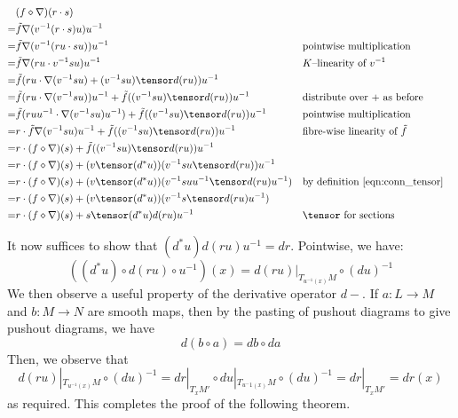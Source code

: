 \begin{align*}
   & (f \diamond \nabla)(r \cdot s) \\
  =& \tilde{f}\nabla(v^{-1}(r \cdot s)u)u^{-1} \\
  =& \tilde{f}\nabla(v^{-1}(ru \cdot su))u^{-1}
    && \text{pointwise multiplication} \\
  =& \tilde{f}\nabla(ru \cdot v^{-1}su)u^{-1}
    && \text{$K$--linearity of } v^{-1} \\
  =& \tilde{f}(ru \cdot \nabla(v^{-1}su) + (v^{-1}su) \tensor d(ru))u^{-1} \\
  =& \tilde{f}(ru \cdot \nabla(v^{-1}su))u^{-1}
      + \tilde{f}((v^{-1}su) \tensor d(ru))u^{-1}
    && \text{distribute over $+$ as before} \\
  =& \tilde{f}(ruu^{-1} \cdot \nabla(v^{-1}su)u^{-1})
      + \tilde{f}((v^{-1}su) \tensor d(ru))u^{-1}
    && \text{pointwise multiplication} \\
  =& r \cdot \tilde{f}\nabla(v^{-1}su)u^{-1}
      + \tilde{f}((v^{-1}su) \tensor d(ru))u^{-1}
    && \text{fibre-wise linearity of } \tilde{f} \\
  =& r \cdot (f \diamond \nabla)(s)
      + \tilde{f}((v^{-1}su) \tensor d(ru))u^{-1} \\
  =& r \cdot (f \diamond \nabla)(s)
      + (v \tensor (d^*u))(v^{-1}su \tensor d(ru))u^{-1} \\
  =& r \cdot (f \diamond \nabla)(s)
      + (v \tensor (d^*u))(v^{-1}suu^{-1} \tensor d(ru)u^{-1})
    && \text{by definition \eqref{eqn:conn_tensor}} \\
  =& r \cdot (f \diamond \nabla)(s)
      + (v \tensor (d^*u))(v^{-1}s \tensor d(ru)u^{-1}) \\
  =& r \cdot (f \diamond \nabla)(s)
      + s \tensor (d^*u)d(ru)u^{-1}
    && \text{$\tensor$ for sections}
\end{align*}

It now suffices to show that $(d^*u)d(ru)u^{-1} = dr$. Pointwise, we have:
\[
  ((d^*u) \circ d(ru) \circ u^{-1})(x) = d(ru)|_{T_{u^{-1}(x)}M} \circ (du)^{-1}
\]
We then observe a useful property of the derivative
operator $d-$. If $a : L \to M$ and $b : M \to N$ are smooth maps, then by the
pasting of pushout diagrams to give pushout diagrams, we have
\[
  d(b \circ a) = db \circ da
\]
Then, we observe that
\[
  d(ru)|_{T_{u^{-1}(x)}M} \circ (du)^{-1}
  = dr|_{T_xM'} \circ du|_{T_{u^-1(x)}M} \circ (du)^{-1}
  = dr|_{T_xM'}
  = dr(x)
\]
as required. This completes the proof of the following theorem.

